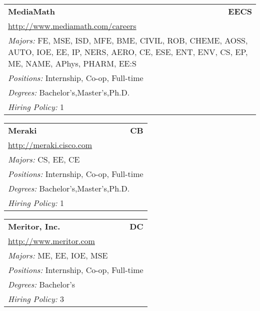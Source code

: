 \documentclass[twoside]{article}
\begin{document}
\begin{center}
\begin{multicols}{3}
\begin{FlushLeft}
\begin{minipage}{\columnwidth}\begin{tabularx}{.95\columnwidth}{Xr}
                 {\Large\bf MediaMath} & {\Large\bf EECS}\\
    \multicolumn{2}{p{.95\columnwidth}}{\url{http://www.mediamath.com/careers}}\\
    \multicolumn{2}{p{.95\columnwidth}}{\emph{Majors:} FE, MSE, ISD, MFE, BME, CIVIL, ROB, CHEME, AOSS, AUTO, IOE, EE, IP, NERS, AERO, CE, ESE, ENT, ENV, CS, EP, ME, NAME, APhys, PHARM, EE:S}\\
    \multicolumn{2}{p{.95\columnwidth}}{\emph{Positions:} Internship, Co-op, Full-time}\\
    \multicolumn{2}{p{.95\columnwidth}}{\emph{Degrees:} Bachelor's,Master's,Ph.D.}\\
    \multicolumn{2}{p{.95\columnwidth}}{\emph{Hiring Policy:} 1}\\
    \end{tabularx}
    
\end{minipage}
 
\begin{minipage}{\columnwidth}\begin{tabularx}{.95\columnwidth}{Xr}
                 {\Large\bf Meraki} & {\Large\bf CB}\\
    \multicolumn{2}{p{.95\columnwidth}}{\url{http://meraki.cisco.com}}\\
    \multicolumn{2}{p{.95\columnwidth}}{\emph{Majors:} CS, EE, CE}\\
    \multicolumn{2}{p{.95\columnwidth}}{\emph{Positions:} Internship, Co-op, Full-time}\\
    \multicolumn{2}{p{.95\columnwidth}}{\emph{Degrees:} Bachelor's,Master's,Ph.D.}\\
    \multicolumn{2}{p{.95\columnwidth}}{\emph{Hiring Policy:} 1}\\
    \end{tabularx}
    
\end{minipage}
 
\begin{minipage}{\columnwidth}\begin{tabularx}{.95\columnwidth}{Xr}
                 {\Large\bf Meritor, Inc.} & {\Large\bf DC}\\
    \multicolumn{2}{p{.95\columnwidth}}{\url{http://www.meritor.com}}\\
    \multicolumn{2}{p{.95\columnwidth}}{\emph{Majors:} ME, EE, IOE, MSE}\\
    \multicolumn{2}{p{.95\columnwidth}}{\emph{Positions:} Internship, Co-op, Full-time}\\
    \multicolumn{2}{p{.95\columnwidth}}{\emph{Degrees:} Bachelor's}\\
    \multicolumn{2}{p{.95\columnwidth}}{\emph{Hiring Policy:} 3}\\
    \end{tabularx}
    

\end{minipage}
\end{FlushLeft}
\end{multicols}
\end{center}
\end{document}
